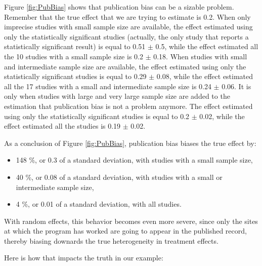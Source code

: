 \documentclass[]{book}
\providecommand{\tightlist}{%
  \setlength{\itemsep}{0pt}\setlength{\parskip}{0pt}}
\theoremstyle{definition}
\theoremstyle{definition}
\theoremstyle{definition}
\theoremstyle{remark}
\let\BeginKnitrBlock\begin \let\EndKnitrBlock\end
\begin{document}
Figure \ref{fig:PubBias} shows that publication bias can be a sizable problem.
Remember that the true effect that we are trying to estimate is 0.2.
When only imprecise studies with small sample size are available, the effect estimated using only the statistically significant studies (actually, the only study that reports a statistically significant result) is equal to 0.51 \(\pm\) 0.5, while the effect estimated all the 10 studies with a small sample size is 0.2 \(\pm\) 0.18.
When studies with small and intermediate sample size are available, the effect estimated using only the statistically significant studies is equal to 0.29 \(\pm\) 0.08, while the effect estimated all the 17 studies with a small and intermediate sample size is 0.24 \(\pm\) 0.06.
It is only when studies with large and very large sample size are added to the estimation that publication bias is not a problem anymore.
The effect estimated using only the statistically significant studies is equal to 0.2 \(\pm\) 0.02, while the effect estimated all the studies is 0.19 \(\pm\) 0.02.

As a conclusion of Figure \ref{fig:PubBias}, publication bias biases the true effect by:

\begin{itemize}
\tightlist
\item
  148 \%, or 0.3 of a standard deviation, with studies with a small sample size,
\item
  40 \%, or 0.08 of a standard deviation, with studies with a small or intermediate sample size,
\item
  4 \%, or 0.01 of a standard deviation, with all studies.
\end{itemize}

With random effects, this behavior becomes even more severe, since only the sites at which the program has worked are going to appear in the published record, thereby biasing downards the true heterogeneity in treatment effects.

\BeginKnitrBlock{example}
\protect\hypertarget{exm:unnamed-chunk-164}{}{\label{exm:unnamed-chunk-164} }Here is how that impacts the truth in our example:
\EndKnitrBlock{example}
\end{document}
